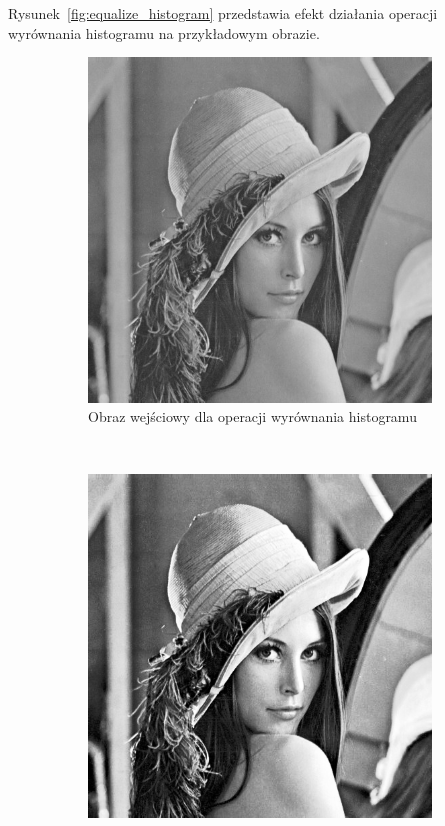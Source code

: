 Rysunek~\ref{fig:equalize_histogram} przedstawia efekt działania operacji wyrównania histogramu na przykładowym obrazie.
\begin{figure}
  \centering
  \begin{subfigure}[b]{0.45\textwidth}
    \includegraphics[width=\textwidth]{img/equalize-histogram-before}
    \caption{Obraz wejściowy dla operacji wyrównania histogramu}
    \label{fig:equalize_histogram_before}
  \end{subfigure}
  ~
  \begin{subfigure}[b]{0.45\textwidth}
    \includegraphics[width=\textwidth]{img/equalize-histogram-after}

\end{subfigure}
\end{figure}
